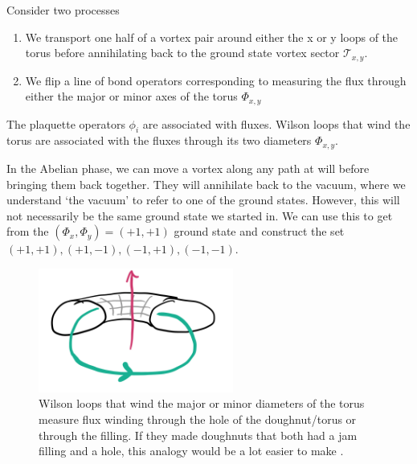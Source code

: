 Consider two processes

\begin{enumerate}
\def\labelenumi{\arabic{enumi})}
\item
  We transport one half of a vortex pair around either the x or y loops of the torus before annihilating back to the ground state vortex sector \(\mathcal{T}_{x,y}\).
\item
  We flip a line of bond operators corresponding to measuring the flux through either the major or minor axes of the torus \(\mathcal{\Phi}_{x,y}\)
\end{enumerate}

The plaquette operators \(\phi_i\) are associated with fluxes. Wilson loops that wind the torus are associated with the fluxes through its two diameters \(\mathcal{\Phi}_{x,y}\).

In the Abelian phase, we can move a vortex along any path at will before bringing them back together. They will annihilate back to the vacuum, where we understand `the vacuum' to refer to one of the ground states. However, this will not necessarily be the same ground state we started in. We can use this to get from the \((\Phi_x, \Phi_y) = (+1, +1)\) ground state and construct the set \((+1, +1), (+1, -1), (-1, +1), (-1, -1)\).

\hypertarget{fig:topological_fluxes}{%
\begin{figure}
\centering
\includegraphics[width=0.57\textwidth,height=\textheight]{figure_code/amk_chapter/topological_fluxes.png}
\caption[{Topological Fluxes}]{Wilson loops that wind the major or minor diameters of the torus measure flux winding through the hole of the doughnut/torus or through the filling. If they made doughnuts that both had a jam filling and a hole, this analogy would be a lot easier to make \autocite{parkerWhyDoesThis}.}
\label{fig:topological_fluxes}
\end{figure}
}

